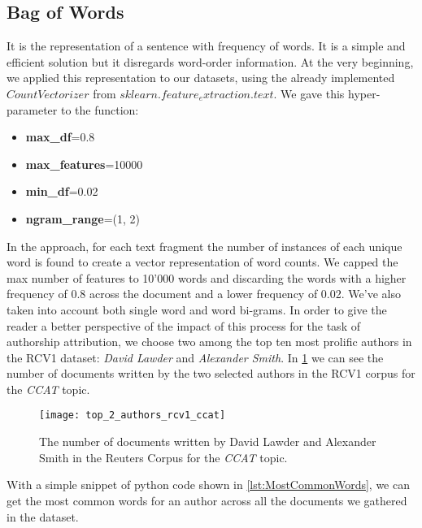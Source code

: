 \subsection{Bag of Words}
It is the representation of a sentence with frequency of words. It is a simple and efficient solution but it disregards word-order information.
At the very beginning, we applied this representation to our datasets, using the already implemented $CountVectorizer$ from $sklearn.feature_extraction.text$. We gave this hyper-parameter to the function:
\begin{itemize}
	\item \textbf{max\_df}=0.8
	\item \textbf{max\_features}=10000
	\item \textbf{min\_df}=0.02
	\item \textbf{ngram\_range}=(1, 2)
\end{itemize}
In the approach, for each text fragment the number of instances of each unique word is found to create a vector representation of word counts. We capped the max number of features to 10'000 words and discarding the words with a higher frequency of 0.8 across the document and a lower frequency of 0.02. We've also taken into account both single word and word bi-grams. In order to give the reader a better perspective of the impact of this process for the task of authorship attribution, we choose two among the top ten most prolific authors in the RCV1 dataset: \textit{David Lawder} and \textit{Alexander Smith}.
In \ref{fig:chartRCV1Top2Authors} we can see the number of documents written by the two selected authors in the RCV1 corpus for the \textit{CCAT} topic.

\begin{figure}[ht]
	\centering
	\texttt{[image: top\_2\_authors\_rcv1\_ccat]}
	\caption[Number of documents for authors in RCV1]{The number of documents written by David Lawder and Alexander Smith in the Reuters Corpus for the \textit{CCAT} topic.}
	\label{fig:chartRCV1Top2Authors}
\end{figure}

With a simple snippet of python code shown in \ref{lst:MostCommonWords}, we can get the most common words for an author across all the documents we gathered in the dataset.

